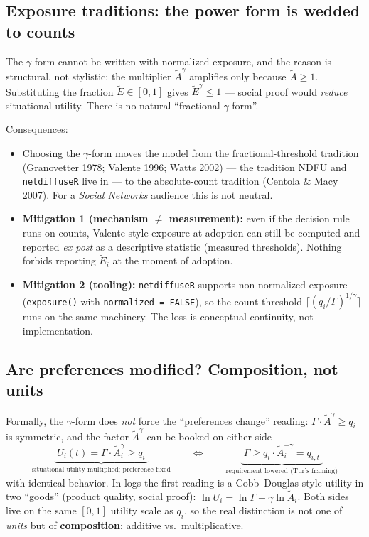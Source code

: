 \documentclass[11pt,a4paper]{article}
\newcommand{\Ee}{\tilde{E}}                 %
\newcommand{\Acount}{\tilde{A}}             %
\newcommand{\code}[1]{\texttt{#1}}
\begin{document}
\subsection{Exposure traditions: the power form is wedded to counts}
\label{sec:exposuretrad}

The $\gamma$-form cannot be written with normalized exposure, and the reason is
structural, not stylistic: the multiplier $\Acount^{\gamma}$ amplifies only because
$\Acount \ge 1$. Substituting the fraction $\Ee \in [0,1]$ gives
$\Ee^{\gamma} \le 1$ --- social proof would \emph{reduce} situational utility. There is
no natural ``fractional $\gamma$-form''.

Consequences:
\begin{itemize}
  \item Choosing the $\gamma$-form moves the model from the fractional-threshold
    tradition (Granovetter 1978; Valente 1996; Watts 2002) --- the tradition NDFU and
    \code{netdiffuseR} live in --- to the absolute-count tradition (Centola \& Macy
    2007). For a \emph{Social Networks} audience this is not neutral.
  \item \textbf{Mitigation 1 (mechanism $\ne$ measurement):} even if the decision rule
    runs on counts, Valente-style exposure-at-adoption can still be computed and
    reported \emph{ex post} as a descriptive statistic (measured thresholds). Nothing
    forbids reporting $\Ee_i$ at the moment of adoption.
  \item \textbf{Mitigation 2 (tooling):} \code{netdiffuseR} supports non-normalized
    exposure (\code{exposure()} with \code{normalized = FALSE}), so the count threshold
    $\lceil (q_i/\Gamma)^{1/\gamma} \rceil$ runs on the same machinery. The loss is
    conceptual continuity, not implementation.
\end{itemize}

\subsection{Are preferences modified? Composition, not units}
\label{sec:preferences}

Formally, the $\gamma$-form does \emph{not} force the ``preferences change'' reading:
$\Gamma \cdot \Acount^{\gamma} \ge q_i$ is symmetric, and the factor
$\Acount^{\gamma}$ can be booked on either side ---
\begin{equation}
  \underbrace{\;U_i(t) = \Gamma \cdot \Acount_i^{\gamma} \ge q_i\;}_{\text{situational
  utility multiplied; preference fixed}}
  \qquad\iff\qquad
  \underbrace{\;\Gamma \ge q_i \cdot \Acount_i^{-\gamma} = q_{i,t}\;}_{\text{requirement
  lowered (Tur's framing)}}
\end{equation}
with identical behavior. In logs the first reading is a Cobb--Douglas-style utility in
two ``goods'' (product quality, social proof): $\ln U_i = \ln \Gamma + \gamma \ln
\Acount_i$. Both sides live on the same $[0,1]$ utility scale as $q_i$, so the real
distinction is not one of \emph{units} but of \textbf{composition}: additive vs.\
multiplicative.
\end{document}

